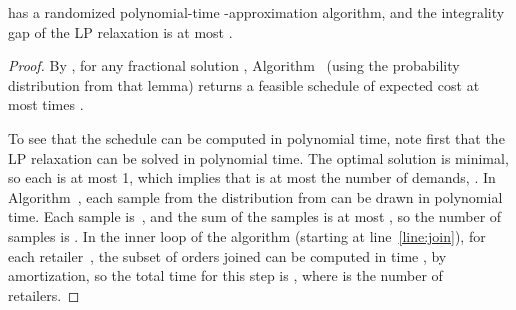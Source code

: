 \begin{theorem}\label{thm: upper bounds}
   has a randomized polynomial-time -approximation algorithm,
  and the integrality gap of the LP relaxation is at most .
\end{theorem}

\begin{proof}
  By ,
  for any fractional solution , Algorithm~
  (using the probability distribution  from that lemma)
  returns a feasible schedule of expected cost at most  
  times .  

  To see that the schedule can be computed in polynomial time,
  note first that the LP relaxation can be solved in polynomial time.
  The optimal solution  is minimal,
  so each  is at most 1, which implies that  
  is at most the number of demands, .
  In Algorithm~,
  each sample from the distribution  from 
  can be drawn in polynomial time.
  Each sample is~, and the sum of the samples 
  is at most ,
  so the number of samples is .
  In the inner loop of the algorithm
  (starting at line~\ref{line:join}),
  for each retailer~, the subset of orders joined
  can be computed in time , by amortization, so the total time for
  this step is , where  is the number of retailers.
\end{proof}


